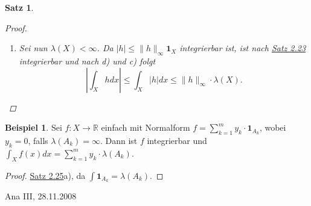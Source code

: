 \documentclass[a4paper]{scrreprt}
\newcommand{\doubleOne}{\textbf{1}}
\newcommand{\R}{\mathbb{R}}
\newcommand{\jlabel}[1]{\label{j_#1}}
\newcommand{\jhyperref}[2]{\hyperref[j_#1]{#2}}
\newcommand{\jlink}[1]{\jhyperref{#1}{#1}}
\newcommand{\jabb}[3]{ #1: #2 \rightarrow #3 }
\newcommand{\jspacesmall}{\vspace{4pt}}
\newcommand{\jdate}[1]{\jspacesmall\begin{center}\jlabel{#1}\tiny{Ana III, #1}\end{center}}
\theoremstyle{plain}
\newtheorem{satz}[thm]{Satz}
\theoremstyle{definition}
\newtheorem*{expl*}{Beispiel}
\begin{document}
{{{{\begin{satz}
\begin{proof}
\begin{enumerate}
            \item
                Sei nun $\lambda(X) < \infty$. Da $|h| \le \lVert h \rVert_\infty \doubleOne_X$ integrierbar ist, ist nach \jlink{Satz 2.23} integrierbar und nach d) und c) folgt
                \begin{displaymath}
                    \left| \int_X h dx \right| \le \int_X |h| dx \le \lVert h \rVert_\infty \cdot \lambda(X).
                \end{displaymath}
        \end{enumerate}
    \end{proof}
\end{satz}

\begin{expl*}
    Sei $\jabb{f}{X}{\R}$ einfach mit Normalform $f = \sum_{k=1}^m y_k \cdot \doubleOne_{A_k}$, wobei $y_k=0$, falls $\lambda(A_k) = \infty$. Dann ist $f$ integrierbar und $\int_X f(x)dx = \sum_{k=1}^m y_k\cdot \lambda(A_k)$.
    \begin{proof}
        \jlink{Satz 2.25}a), da $\int \doubleOne_{A_k} = \lambda(A_k)$.
    \end{proof}
\end{expl*}


\jdate{28.11.2008}


}}}}
\end{document}
